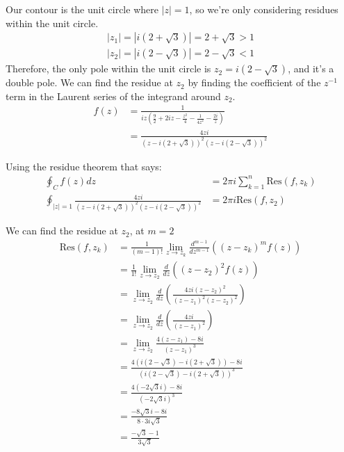 \begin{example}
    Our contour is the unit circle where $|z| = 1$, so we're only considering residues within the unit circle.
    \begin{align*}
        |z_1| = |i(2 + \sqrt{3})| = 2 + \sqrt{3} > 1 \\
        |z_2| = |i(2 - \sqrt{3})| = 2 - \sqrt{3} < 1
    \end{align*}
    Therefore, the only pole within the unit circle is $z_2 = i(2 - \sqrt{3})$, and it's a double pole. We can find the residue at $z_2$ by finding the coefficient of the $z^{-1}$ term in the Laurent series of the integrand around $z_2$.
    \begin{align*}
        f(z) & = \frac{1}{iz(\frac{9}{2} +2iz - \frac{z^2}{4} - \frac{1}{4z^2} - \frac{2i}{z})} \\
             & = \frac{4zi}{(z - i(2 + \sqrt{3}))^2(z - i(2 - \sqrt{3}))^2}
    \end{align*}

    Using the residue theorem that says:
    \begin{align*}
        \oint_C f(z)dz                                                           & = 2\pi i \sum_{k=1}^n \text{Res}(f, z_k) \\
        \oint_{|z|=1} \frac{4zi}{(z - i(2 + \sqrt{3}))^2(z - i(2 - \sqrt{3}))^2} & = 2\pi i \text{Res}(f, z_2)
    \end{align*}

    We can find the residue at $z_2$, at $m = 2$
    \begin{align*}
        \text{Res}(f,z_k) & = \frac{1}{(m - 1)!}\lim_{z \to z_k} \frac{d^{m-1}}{dz^{m-1}} \left( (z - z_k)^m f(z) \right) \\
                          & = \frac{1}{1!}\lim_{z \to z_2} \frac{d}{dz} \left( (z - z_2)^2 f(z) \right)                   \\
                          & = \lim_{z \to z_2} \frac{d}{dz} \left( \frac{4zi(z - z_2)^2}{(z - z_1)^2(z - z_2)^2} \right)  \\
                          & = \lim_{z \to z_2} \frac{d}{dz} \left( \frac{4zi}{(z - z_1)^2} \right)                        \\
                          & = \lim_{z \to z_2} \frac{4(z - z_1) - 8i}{(z - z_1)^3}                                        \\
                          & = \frac{4(i(2 - \sqrt{3}) - i(2 + \sqrt{3})) - 8i}{(i(2 - \sqrt{3}) - i(2 + \sqrt{3}))^3}     \\
                          & = \frac{4(-2\sqrt{3}i) - 8i}{(-2\sqrt{3}i)^3}                                                 \\
                          & = \frac{-8\sqrt{3}i - 8i}{8\cdot 3i\sqrt{3}}                                                  \\
                          & = \frac{-\sqrt{3} - 1}{3\sqrt{3}}                                                             \\
    \end{align*}


\end{example}
